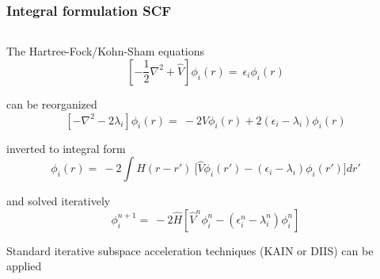 \begin{frame}
    \frametitle{Integral formulation SCF}
    \begin{columns}
    \begin{column}[b]{0.45\textwidth}

    \centering
    The Hartree-Fock/Kohn-Sham equations
    \begin{equation}
        \nonumber
        \left[-\frac{1}{2}\nabla^2 + \hat{V}\right]
        \phi_i(r) =\ \epsilon_i \phi_i(r)
    \end{equation}

    \vspace{5mm}
    can be reorganized
    \begin{equation}
        \nonumber
        \left[-\nabla^2 - 2\lambda_i\right]\phi_i(r) =\ 
        -2\hat{V}\phi_i(r) + 2(\epsilon_i - \lambda_i)\phi_i(r)
    \end{equation}

    \vspace{5mm}
    inverted to integral form
    \begin{equation}
        \nonumber
        \phi_i(r) =\ -2\int H(r-r')\
        \Big[\hat{V} \phi_i(r') - (\epsilon_i - \lambda_i)\phi_i(r')\Big] dr'
    \end{equation}

    \vspace{5mm}
    and solved iteratively
    \begin{equation}
        \nonumber
        \phi_i^{n+1} =\ -2\hat{H}\left[\hat{V}^n\phi_i^n
        - (\epsilon^n_i - \lambda^n_i)\phi_i^n\right]
    \end{equation}

    \vspace{5mm}
    Standard iterative subspace acceleration 
    techniques (KAIN or DIIS) can be applied
    \vspace{5mm}
    \end{column}


\end{columns}
\end{frame}
